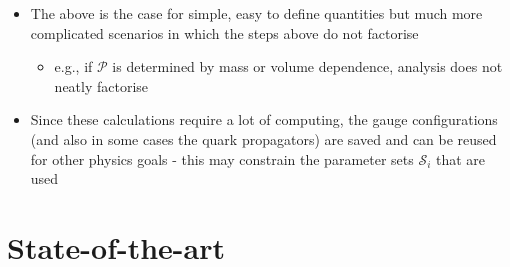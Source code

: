\begin{itemize}
    \item The above is the case for simple, easy to define quantities but much more complicated scenarios in which the steps above do not factorise
    \begin{itemize}
        \item e.g., if $\mathcal{P}$ is determined by mass or volume dependence, analysis does not neatly factorise
    \end{itemize}
    \item Since these calculations require a lot of computing, the gauge configurations (and also in some cases the quark propagators) are saved and can be reused for other physics goals - this may constrain the parameter sets $\mathcal{S}_i$ that are used
\end{itemize}

\section{State-of-the-art}

